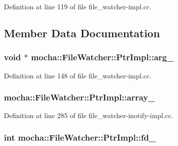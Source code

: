 Definition at line 119 of file file\_\-watcher-\/impl.cc.



\subsection{Member Data Documentation}
\hypertarget{classmocha_1_1_file_watcher_1_1_ptr_impl_ac4ef839936e2c0df50e1332884ff32e2}{
\subsubsection[{arg\_\-}]{\setlength{\rightskip}{0pt plus 5cm}void $\ast$ {\bf mocha::FileWatcher::PtrImpl::arg\_\-}}}
\label{classmocha_1_1_file_watcher_1_1_ptr_impl_ac4ef839936e2c0df50e1332884ff32e2}


Definition at line 148 of file file\_\-watcher-\/impl.cc.

\hypertarget{classmocha_1_1_file_watcher_1_1_ptr_impl_a7e8eab76d8ad6bcc7e44f756b0eca624}{
\subsubsection[{array\_\-}]{ {\bf mocha::FileWatcher::PtrImpl::array\_\-}}}
\label{classmocha_1_1_file_watcher_1_1_ptr_impl_a7e8eab76d8ad6bcc7e44f756b0eca624}


Definition at line 285 of file file\_\-watcher-\/inotify-\/impl.cc.

\hypertarget{classmocha_1_1_file_watcher_1_1_ptr_impl_ad12b5cd049def2da9eed58c9f8aad348}{
\subsubsection[{fd\_\-}]{\setlength{\rightskip}{0pt plus 5cm}int {\bf mocha::FileWatcher::PtrImpl::fd\_\-}}}
\label{classmocha_1_1_file_watcher_1_1_ptr_impl_ad12b5cd049def2da9eed58c9f8aad348}


